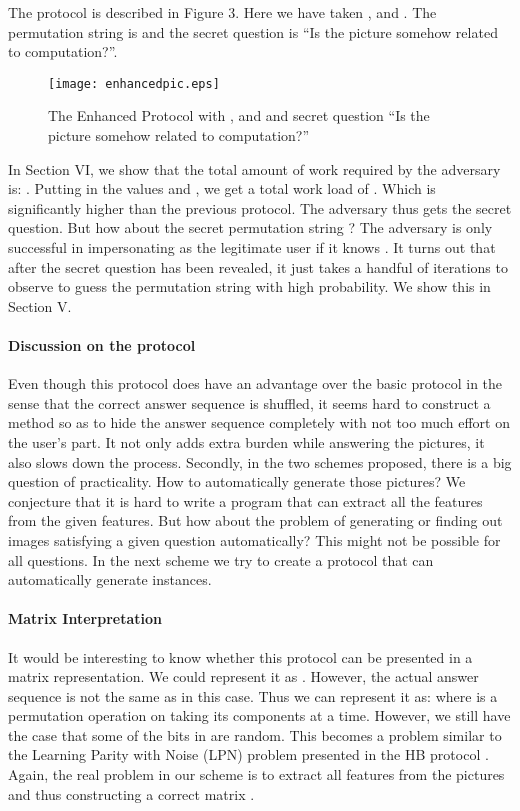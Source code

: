 \documentclass{llncs}
\begin{document}
The protocol is described in Figure 3. Here we have taken ,  and . The permutation string is  and the secret question is  ``Is the picture somehow related to computation?''. 
\begin{figure}[ht]
\centerline{\texttt{[image: enhancedpic.eps]}}
\caption{The Enhanced Protocol with ,  and  and secret question ``Is the picture somehow related to computation?''}
\label{fig8}
\end{figure}

In Section VI, we show that the total amount of work required by the adversary is: . Putting in the values  and , we get a total work load of . Which is significantly higher than the previous protocol. The adversary thus gets the secret question. But how about the secret permutation string ? The adversary is only successful in impersonating as the legitimate user if it knows . It turns out that after the secret question has been revealed, it just takes a handful of iterations to observe to guess the permutation string with high probability. We show this in Section V.
 
\paragraph*{Discussion on the protocol} Even though this protocol does have an advantage over the basic protocol in the sense that the correct answer sequence is shuffled, it seems hard to construct a method so as to hide the answer sequence completely with not too much effort on the user's part. It not only adds extra burden while answering the pictures, it also slows down the process. Secondly, in the two schemes proposed, there is a big question of practicality. 
How to automatically generate those pictures? We conjecture that it is hard to write a program that can extract all the features from the given features. But how about the problem of generating or finding out images satisfying a given question automatically? This might not be possible for all questions. In the next scheme we try to create a protocol that can automatically generate instances. 
\paragraph*{Matrix Interpretation} It would be interesting to know whether this protocol can be presented in a matrix representation. We could represent it as . However, the actual answer sequence is not the same as  in this case. Thus we can represent it as:   where  is a permutation operation on 
 taking its  components at a time. However, we still have the case that some of the bits in  are random. This becomes a problem similar to the Learning Parity with Noise (LPN) problem presented in the HB protocol \cite{hopper}. Again, the real problem in our scheme is to extract all features from the pictures and thus constructing a correct matrix .
\end{document}
